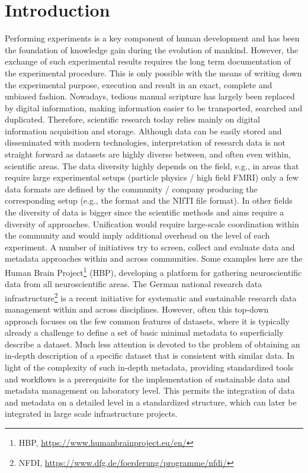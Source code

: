 \clearpage
\chapter{Introduction}
\label{sec:intro}
Performing experiments is a key component of human development and has been the foundation of knowledge gain during the evolution of mankind. However, the exchange of such experimental results requires the long term documentation of the  experimental procedure. This is only possible with the means of writing down the experimental purpose, execution and result in an exact, complete and unbiased fashion. Nowadays, tedious manual scripture has largely been replaced by digital information, making information easier to be transported, searched and duplicated. Therefore, scientific research today relies mainly on digital information acquisition and storage. Although data can be easily stored and disseminated with modern technologies, interpretation of research data is not straight forward as datasets are highly diverse between, and often even within, scientific areas. The data diversity highly depends on the field, e.g., in areas that require large experimental setups (particle physics / high field FMRI) only a few data formats are defined by the community / company producing the corresponding setup (e.g., the  format \citep{Brun_1996} and the NIfTI file format). In other fields the diversity of data is bigger since the scientific methods and aims require a diversity of approaches. Unification would require large-scale coordination within the community and  would imply additional overhead on the level of each experiment. A number of initiatives try to screen, collect and evaluate data and metadata approaches within and across communities. Some examples here are the Human Brain Project\footnote{HBP, \url{https://www.humanbrainproject.eu/en/}} (HBP), developing a platform for gathering neuroscientific data from all neuroscientific areas. The German national research data infrastructure\footnote{NFDI, \url{https://www.dfg.de/foerderung/programme/nfdi/}} is a recent initiative for systematic and sustainable research data management within and across disciplines. However, often this top-down approach focuses on the few common features of datasets, where it is typically already a challenge to define a set of basic minimal metadata to superficially describe a dataset. Much less attention is devoted to the problem of obtaining an in-depth description of a specific dataset that is consistent with similar data. In light of the complexity of such in-depth metadata, providing standardized tools and workflows is a prerequisite for the implementation of sustainable data and metadata management on laboratory level. This permits the integration of data and metadata on a detailed level in a standardized structure, which can later be integrated in large scale infrastructure projects.


